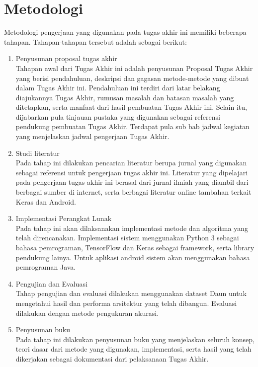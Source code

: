 \section {Metodologi}

Metodologi pengerjaan yang digunakan pada tugas akhir ini memiliki beberapa tahapan. Tahapan-tahapan tersebut adalah sebagai berikut:

\begin{enumerate}
\item Penyusunan proposal tugas akhir\\
Tahapan awal dari Tugas Akhir ini adalah penyusunan Proposal Tugas Akhir yang berisi pendahuluan, deskripsi dan gagasan metode-metode yang dibuat dalam Tugas Akhir ini.
Pendahuluan ini terdiri dari latar belakang diajukannya Tugas Akhir, rumusan masalah dan batasan masalah yang ditetapkan, serta manfaat dari hasil pembuatan Tugas Akhir ini. Selain itu, dijabarkan pula tinjauan pustaka yang digunakan sebagai referensi pendukung pembuatan Tugas Akhir. Terdapat pula sub bab jadwal kegiatan yang menjelaskan jadwal pengerjaan Tugas Akhir.
\item Studi literatur\\
Pada tahap ini dilakukan pencarian literatur berupa jurnal yang digunakan sebagai referensi untuk pengerjaan tugas akhir ini. Literatur yang dipelajari pada pengerjaan tugas akhir ini
berasal dari jurnal ilmiah yang diambil dari berbagai sumber di internet, serta berbagai literatur online tambahan terkait Keras dan Android.
\item Implementasi Perangkat Lunak\\
Pada tahap ini akan dilaksanakan implementasi metode dan algoritma yang telah direncanakan. Implementasi sistem menggunakan Python 3 sebagai bahasa pemrograman,
TensorFlow dan Keras sebagai framework, serta library pendukung lainya. Untuk aplikasi android sistem akan menggunakan bahasa pemrograman Java.
\item Pengujian dan Evaluasi\\
Tahap pengujian dan evaluasi dilakukan menggunakan dataset Daun untuk mengetahui hasil dan performa arsitektur yang telah dibangun. Evaluasi dilakukan dengan metode pengukuran akurasi.
\item Penyusunan buku\\
Pada tahap ini dilakukan penyusunan buku yang menjelaskan seluruh konsep, teori dasar dari metode yang digunakan, implementasi, serta hasil yang telah dikerjakan sebagai dokumentasi dari pelaksanaan Tugas Akhir.
\end{enumerate}

